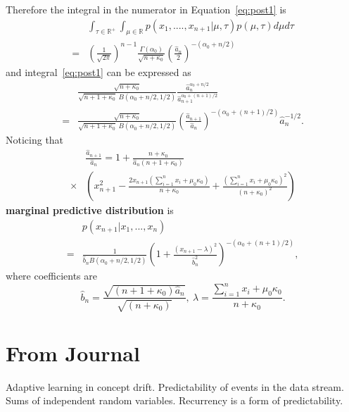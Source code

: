 Therefore the integral in the numerator in Equation~\ref{eq:post1} is
\begin{align}
    &\int_{\tau\in \mathbb{R}^+} \int_{\mu\in \mathbb{R}}p(x_1,....,x_{n+1}|\mu,\tau) p(\mu,\tau)d\mu d\tau\\\nonumber
    =& \left(\frac{1}{\sqrt{2\pi}}\right)^{n-1} \frac{\Gamma(\alpha_0)}{\sqrt{n+\kappa_0}} \left(\frac{\hat{a}_n}2\right)^{-(\alpha_0+n/2)}
\end{align}
and integral~\ref{eq:post1} can be expressed as
\begin{align}
    &\frac{\sqrt{n+\kappa_0}}{\sqrt{n+1+\kappa_0}\ B(\alpha_0+n/2,1/2)} \frac{\hat{a}_n^{\alpha_0+n/2}}{\hat{a}_{n+1}^{\alpha_0+(n+1)/2}}\\\nonumber
    =&\frac{\sqrt{n+\kappa_0}}{\sqrt{n+1+\kappa_0}\ B(\alpha_0+n/2,1/2)} \left(\frac{\hat{a}_{n+1}}{\hat{a}_n}\right)^{-(\alpha_0+(n+1)/2)} \hat{a}_n^{-1/2}.
\end{align}
Noticing that
\begin{align}
    &\frac{\hat{a}_{n+1}}{\hat{a}_n} = 1+ \frac{n+\kappa_0}{\hat{a}_n(n+1+\kappa_0)}\\\nonumber \times &\left(x_{n+1}^2 - \frac{2x_{n+1}\left(\sum_{i=1}^n x_i +\mu_0 \kappa_0\right)}{n+\kappa_0}
    + \frac{\left(\sum_{i=1}^n x_i +\mu_0 \kappa_0\right)^2}{(n+\kappa_0)^2}\right)
\end{align}
\textbf{marginal predictive distribution} is 
\begin{align}
    &p(x_{n+1}|x_1,...,x_n)\\\nonumber =& \frac{1}{\hat{b}_n B(\alpha_0+n/2,1/2)} \left(
1+\frac{(x_{n+1}-\lambda)^2}{\hat{b}_n^2}\right)^{-(\alpha_0+(n+1)/2)},
\end{align}
where coefficients are
\begin{equation}
    \hat{b}_n = \frac{\sqrt{(n+1+\kappa_0)\hat{a}_n}}{\sqrt{(n+\kappa_0)}},\ \lambda = \frac{\sum_{i=1}^n x_i +\mu_0 \kappa_0}{n+\kappa_0}.
\end{equation}


\section{From Journal}

Adaptive learning in concept drift.
Predictability of events in the data stream.
Sums of independent random variables.
Recurrency is a form of predictability.



